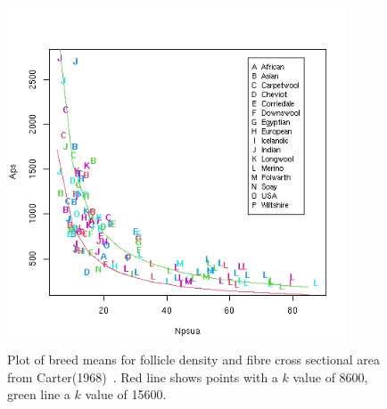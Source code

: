 %

\begin{figure}[h]
  \centering
   \includegraphics[width=0.9\textwidth]{carter68/carter68withk.png}
  \caption{Plot of breed means for follicle density and fibre cross sectional area from Carter(1968)~\cite{cart:68}. Red line shows points with a $k$ value of 8600, green line a $k$ value of 15600.}
  \label{fig:hypfam}
\end{figure}

%

